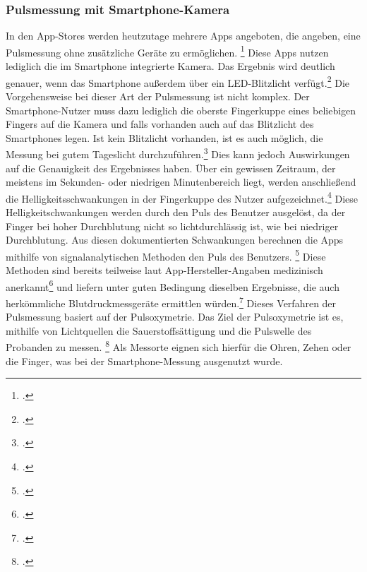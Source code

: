 \subsubsection{Pulsmessung mit Smartphone-Kamera}
In den App-Stores werden heutzutage mehrere Apps angeboten, die angeben, eine Pulsmessung ohne zusätzliche Geräte zu ermöglichen. \footcite[Vorstellung von Pulsmessungs-Apps auf dem Markt: Vgl.][]{Pet17} Diese Apps nutzen lediglich die im Smartphone integrierte Kamera. Das Ergebnis wird deutlich genauer, wenn das Smartphone außerdem über ein LED-Blitzlicht verfügt.\footcite[Vgl.][]{Gil14} \newline
Die Vorgehensweise bei dieser Art der Pulsmessung ist nicht komplex. Der Smartphone-Nutzer muss dazu lediglich die oberste Fingerkuppe eines beliebigen Fingers auf die Kamera und falls vorhanden auch auf das Blitzlicht des Smartphones legen. Ist kein Blitzlicht vorhanden, ist es auch möglich, die Messung bei gutem Tageslicht durchzuführen.\footcite[Vgl.][]{Gil14} Dies kann jedoch Auswirkungen auf die Genauigkeit des Ergebnisses haben. Über ein gewissen Zeitraum, der meistens im Sekunden- oder niedrigen Minutenbereich liegt, werden anschließend die Helligkeitsschwankungen in der Fingerkuppe des Nutzer aufgezeichnet.\footcite[Vgl.][]{Pre16} Diese Helligkeitschwankungen werden durch den Puls des Benutzer ausgelöst, da der Finger bei hoher Durchblutung nicht so lichtdurchlässig ist, wie bei niedriger Durchblutung. Aus diesen dokumentierten Schwankungen berechnen die Apps mithilfe von signalanalytischen Methoden den Puls des Benutzers. \footcite[Vgl.][]{Pre16} \newline
Diese Methoden sind bereits teilweise laut App-Hersteller-Angaben medizinisch anerkannt\footcite[Vgl.][]{Pre16} und liefern unter guten Bedingung dieselben Ergebnisse, die auch herkömmliche Blutdruckmessgeräte ermittlen würden.\footcite[Vgl.][]{Hen17}
Dieses Verfahren der Pulsmessung basiert auf der Pulsoxymetrie. Das Ziel der Pulsoxymetrie ist es, mithilfe von Lichtquellen die Sauerstoffsättigung und die Pulswelle des Probanden zu messen. \footcite[Vgl. ][S. 74]{Deu09} Als Messorte eignen sich hierfür die Ohren, Zehen oder die Finger, was bei der Smartphone-Messung ausgenutzt wurde. \newline 
